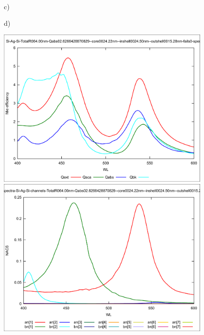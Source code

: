 \documentclass[a4paper]{article}
\begin{document}
\begin{figure}
\begin{minipage}[h]{0.49\textwidth}
  \end{minipage}
  \begin{minipage}[h]{0.49\textwidth}    \begin{flushleft}     c)    \end{flushleft}
  \end{minipage}
  \begin{minipage}[h]{0.49\textwidth}    \begin{flushleft}     d)    \end{flushleft}
  \end{minipage}
  \begin{minipage}[h]{0.49\textwidth} 
   \includegraphics[width=0.95\textwidth]{band80-em}
  \end{minipage}
  \begin{minipage}[h]{0.49\textwidth} 
    \includegraphics[width=0.95\textwidth]{band80-em-ch}

\end{minipage}
\end{figure}
\end{document}
